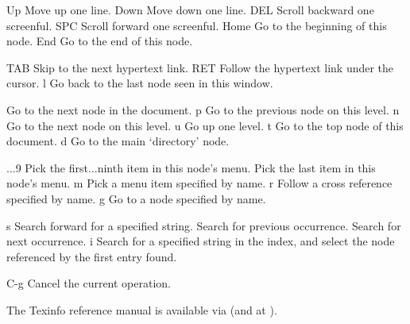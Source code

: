 \infokey Up          Move up one line.\cr
\infokey Down        Move down one line.\cr
\infokey DEL         Scroll backward one screenful.\cr
\infokey SPC         Scroll forward one screenful.\cr
\infokey Home        Go to the beginning of this node.\cr
\infokey End         Go to the end of this node.\cr

\infokey TAB         Skip to the next hypertext link.\cr
\infokey RET         Follow the hypertext link under the cursor.\cr
\infokey l           Go back to the last node seen in this window.\cr

           Go to the next node in the document.\cr
\infokey p           Go to the previous node on this level.\cr
\infokey n           Go to the next node on this level.\cr
\infokey u           Go up one level.\cr
\infokey t           Go to the top node of this document.\cr
\infokey d           Go to the main `directory' node.\cr

...9       Pick the first...ninth item in this node's menu.\cr
{}           Pick the last item in this node's menu.\cr
\infokey m           Pick a menu item specified by name.\cr
\infokey r           Follow a cross reference specified by name.\cr
\infokey g           Go to a node specified by name.\cr

\infokey s           Search forward for a specified string.\cr
\infokey \lbracechar{}           Search for previous occurrence.\cr
\infokey \rbracechar{}           Search for next occurrence.\cr
\infokey i           Search for a specified string in the index, and\cr
\infokey {}              select the node referenced by the first entry found.\cr

\infokey C-g         Cancel the current operation.\cr
\endinfokeys

The Texinfo reference manual is available via \hfil\break
(and at ).

\copyrightnotice
\bye
